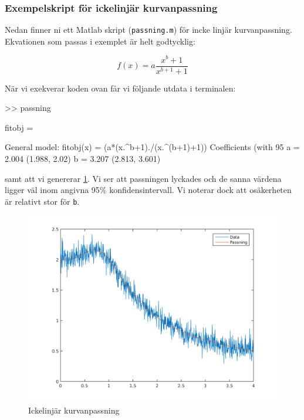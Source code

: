 \subsubsection{Exempelskript för ickelinjär kurvanpassning}
Nedan finner ni ett Matlab skript ({\tt passning.m}) för incke linjär kurvanpassning.
Ekvationen som passas i exemplet är helt godtycklig:

\begin{equation}
  f(x) = a\frac{x^b+1}{x^{b+1}+1}
\end{equation}


\pagebreak
När vi exekverar koden ovan får vi följande utdata i terminalen:

\begin{terminaloutput}
>> passning

fitobj = 

     General model:
     fitobj(x) = (a*(x.^b+1)./(x.^(b+1)+1))
     Coefficients (with 95%
       a =       2.004  (1.988, 2.02)
       b =       3.207  (2.813, 3.601)
\end{terminaloutput}

samt att vi genererar \cref{fig:matlab}. Vi ser att passningen
lyckades och de sanna värdena ligger väl inom angivna 95\% 
konfidensintervall. Vi noterar dock att osäkerheten är relativt stor för
{\tt b}.

\begin{figure}
  \centering
  \includegraphics[scale=0.5]{matlab/passning.png}
  \caption{Ickelinjär kurvanpassning}
  \label{fig:matlab}
\end{figure}